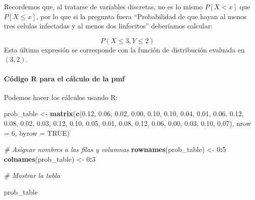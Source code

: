 \documentclass[
]{article}
\newenvironment{Shaded}{\begin{snugshade}}{\end{snugshade}}
\newcommand{\AttributeTok}[1]{\textcolor[rgb]{0.13,0.29,0.53}{#1}}
\newcommand{\CommentTok}[1]{\textcolor[rgb]{0.56,0.35,0.01}{\textit{#1}}}
\newcommand{\ConstantTok}[1]{\textcolor[rgb]{0.56,0.35,0.01}{#1}}
\newcommand{\DecValTok}[1]{\textcolor[rgb]{0.00,0.00,0.81}{#1}}
\newcommand{\FloatTok}[1]{\textcolor[rgb]{0.00,0.00,0.81}{#1}}
\newcommand{\FunctionTok}[1]{\textcolor[rgb]{0.13,0.29,0.53}{\textbf{#1}}}
\newcommand{\NormalTok}[1]{#1}
\newcommand{\OtherTok}[1]{\textcolor[rgb]{0.56,0.35,0.01}{#1}}
\newcommand{\SpecialCharTok}[1]{\textcolor[rgb]{0.81,0.36,0.00}{\textbf{#1}}}
\begin{document}
Recordemos que, al tratarse de variables discretas, no es lo mismo \(P[X < x]\) que \(P[X \leq x]\), por lo que si la pregunta fuera ``Probabilidad de que hayan al menos tres celulas infectadas y al menos dos linfocitos'' deberíamos calcular:

\[
P(X \leq 3, Y \leq 2) 
\]
Esta última expresión se corresponde con la función de distribución evaluada en \((3,2)\).

\paragraph{Código R para el cálculo de la pmf}\label{cuxf3digo-r-para-el-cuxe1lculo-de-la-pmf}

Podemos hacer los cálculos usando R:

\begin{Shaded}
\begin{Highlighting}[]
\NormalTok{prob\_table }\OtherTok{\textless{}{-}} \FunctionTok{matrix}\NormalTok{(}\FunctionTok{c}\NormalTok{(}\FloatTok{0.12}\NormalTok{, }\FloatTok{0.06}\NormalTok{, }\FloatTok{0.02}\NormalTok{, }\FloatTok{0.00}\NormalTok{,}
                       \FloatTok{0.10}\NormalTok{, }\FloatTok{0.10}\NormalTok{, }\FloatTok{0.04}\NormalTok{, }\FloatTok{0.01}\NormalTok{,}
                       \FloatTok{0.06}\NormalTok{, }\FloatTok{0.12}\NormalTok{, }\FloatTok{0.08}\NormalTok{, }\FloatTok{0.02}\NormalTok{,}
                       \FloatTok{0.03}\NormalTok{, }\FloatTok{0.12}\NormalTok{, }\FloatTok{0.10}\NormalTok{, }\FloatTok{0.05}\NormalTok{,}
                       \FloatTok{0.01}\NormalTok{, }\FloatTok{0.08}\NormalTok{, }\FloatTok{0.12}\NormalTok{, }\FloatTok{0.06}\NormalTok{,}
                       \FloatTok{0.00}\NormalTok{, }\FloatTok{0.03}\NormalTok{, }\FloatTok{0.10}\NormalTok{, }\FloatTok{0.07}\NormalTok{), }
                     \AttributeTok{nrow =} \DecValTok{6}\NormalTok{, }\AttributeTok{byrow =} \ConstantTok{TRUE}\NormalTok{)}

\CommentTok{\# Asignar nombres a las filas y columnas}
\FunctionTok{rownames}\NormalTok{(prob\_table) }\OtherTok{\textless{}{-}} \DecValTok{0}\SpecialCharTok{:}\DecValTok{5}
\FunctionTok{colnames}\NormalTok{(prob\_table) }\OtherTok{\textless{}{-}} \DecValTok{0}\SpecialCharTok{:}\DecValTok{3}

\CommentTok{\# Mostrar la tabla}

\NormalTok{prob\_table}
\end{Highlighting}
\end{Shaded}
\end{document}
